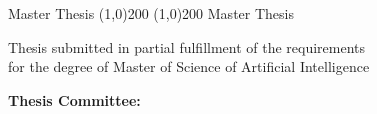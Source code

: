 %
%
%

\makeatletter
\begin{titlepage}

  \vspace*{2cm}
  \center \Large Master Thesis
  \center \line(1,0){200}
  \vspace{0.1cm}
  \makethesistitle
  \vspace{0.1cm}
  \center \line(1,0){200}
  \vspace{0.3cm}
  \center \small Master Thesis \id
  \vspace{2cm}
  \begin{center}
    \small
    Thesis submitted in partial fulfillment of the requirements\\ for the degree of Master of Science of Artificial Intelligence
  \end{center}
  \vspace{.5cm}
  \begin{center}
        \small \textbf{Thesis Committee:}\\
        \committee
  \end{center}
  \vspace{.5cm}
  \makeinstitution
  \vspace{.5cm}
  \center \small \@date

\end{titlepage}
\makeatother
